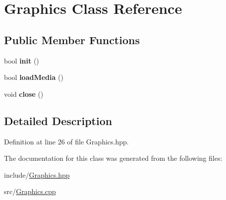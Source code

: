 \hypertarget{class_graphics}{}\section{Graphics Class Reference}
\label{class_graphics}
\subsection*{Public Member Functions}
\begin{DoxyCompactItemize}
\item 
\mbox{\label{class_graphics_a64b5764b2dbef1b6df23ce18b1a918a1}} 
bool {\bfseries init} ()
\item 
\mbox{\label{class_graphics_afc73b9d97804e153e361353afac1c3ad}} 
bool {\bfseries load\+Media} ()
\item 
\mbox{\label{class_graphics_a5285ec6ed237f24f7d7cf2423886a0cc}} 
void {\bfseries close} ()
\end{DoxyCompactItemize}


\subsection{Detailed Description}


Definition at line 26 of file Graphics.\+hpp.



The documentation for this class was generated from the following files\+:\begin{DoxyCompactItemize}
\item 
include/\mbox{\hyperlink{_graphics_8hpp}{Graphics.\+hpp}}\item 
src/\mbox{\hyperlink{_graphics_8cpp}{Graphics.\+cpp}}\end{DoxyCompactItemize}
